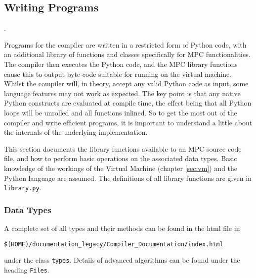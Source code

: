 \label{sec:Mamba}
\subsection{Writing Programs}

.

Programs for the compiler are written in a restricted form of Python code,
with an additional library of functions and classes specifically for MPC
functionalities. The compiler then executes the Python code, and the MPC
library functions cause this to output
byte-code suitable for running on the virtual machine.
Whilst the compiler will, in theory, accept any valid Python
code as input, some language features may not work as expected.
The key point is that any native Python constructs are evaluated at compile
time, the effect being that all Python loops will be unrolled and all functions
inlined.
So to get the most out of the compiler and write efficient programs,
it is important to understand a little about the internals of the underlying implementation.

This section documents the library functions available to an MPC source code
file, and how to perform basic operations on the associated data types.
Basic knowledge of the workings of the Virtual Machine
(chapter \ref{sec:vm}) and the Python language are assumed. The definitions
of all library functions are given in \verb|library.py|.

\subsubsection{Data Types}
\label{ref:datatypes}

A complete set of all types and their methods can be found in
the html file in
\begin{center}
  \verb+$(HOME)/documentation_legacy/Compiler_Documentation/index.html+
\end{center}
under the class \verb+types+.
Details of advanced algorithms can be found under the heading
\verb+Files+.
